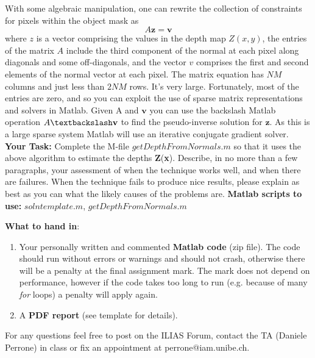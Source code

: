 \documentclass{paper}
\begin{document}
With some algebraic manipulation, one can rewrite the collection of constraints for pixels within the object mask as
\begin{equation}
A\textbf{z}=\textbf{v}
\end{equation}
where $z$ is a vector comprising the values in the depth map $Z(x,y)$, the entries of the matrix $A$ include the third component of the normal at each pixel along diagonals and some off-diagonals, and the vector $v$ comprises the first and second elements of the normal vector at each pixel. The matrix equation has $NM$ columns and just less than $2NM$ rows. It's very large. Fortunately, most of the entries are zero, and so you can exploit the use of sparse matrix representations and solvers in Matlab. Given A and $\textbf{v}$ you can use the backslash Matlab operation $A\textbackslash \textbf{v}$ to find the pseudo-inverse solution for $\textbf{z}$. As this is a large sparse system Matlab will use an iterative conjugate gradient solver.\newline
\textbf{Your Task: }Complete the M-file $getDepthFromNormals.m$ so that it uses the above algorithm to estimate the depths \textbf{Z}(\textbf{x}). Describe, in no more than a few paragraphs, your assessment of when the technique works well, and when there are failures. When the technique fails to produce nice results, please explain as best as you can what the likely causes of the problems are.\newline
\textbf{Matlab scripts to use:} $solntemplate.m$, $getDepthFromNormals.m$



\textbf{What to hand in}: 


\begin{enumerate}

\item Your personally written and commented \textbf{Matlab code} (zip file). The code should run without errors or warnings and should not crash, otherwise there will be a penalty at the final assignment mark. The mark does not depend on performance, however if the code takes too long to run (e.g. because of many \textit{for} loops) a penalty will apply again.

\item A \textbf{PDF report} (see template for details). 


\end{enumerate}

For any questions feel free to post on the ILIAS Forum, contact the TA (Daniele Perrone) in class or fix an appointment at perrone@iam.unibe.ch.












 
\end{document}
